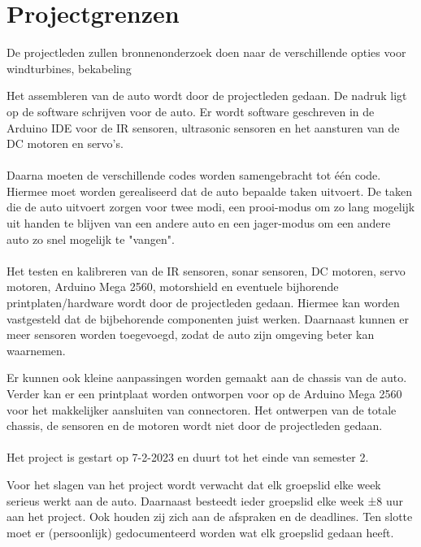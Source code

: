 \section{Projectgrenzen}
De projectleden zullen bronnenonderzoek doen naar de verschillende opties voor windturbines, bekabeling 



Het assembleren van de auto wordt door de projectleden gedaan. De nadruk ligt op de software schrijven voor de auto. Er wordt software geschreven in de Arduino IDE voor de IR sensoren, ultrasonic sensoren en het aansturen van de DC motoren en servo’s.
\\\\
Daarna moeten de verschillende codes worden samengebracht tot één code. Hiermee moet worden gerealiseerd dat de auto bepaalde taken uitvoert. De taken die de auto uitvoert zorgen voor twee modi, een prooi-modus om zo lang mogelijk uit handen te blijven van een andere auto en een jager-modus om een andere auto zo snel mogelijk te "vangen".
\\\\
Het testen en kalibreren van de IR sensoren, sonar sensoren, DC motoren, servo motoren, Arduino Mega 2560, motorshield en eventuele bijhorende printplaten/hardware wordt door de projectleden gedaan. Hiermee kan worden vastgesteld dat de bijbehorende componenten juist werken. Daarnaast kunnen er meer sensoren worden toegevoegd, zodat de auto zijn omgeving beter kan waarnemen. 

Er kunnen ook kleine aanpassingen worden gemaakt aan de chassis van de auto. Verder kan er een printplaat worden ontworpen voor op de Arduino Mega 2560 voor het makkelijker aansluiten van connectoren.
Het ontwerpen van de totale chassis, de sensoren en de motoren wordt niet door de projectleden gedaan.
\\\\
Het project is gestart op 7-2-2023 en duurt tot het einde van semester 2.

Voor het slagen van het project wordt verwacht dat elk groepslid elke week serieus werkt aan de auto. Daarnaast besteedt ieder groepslid elke week ±8 uur aan het project. Ook houden zij zich aan de afspraken en de deadlines. Ten slotte moet er (persoonlijk) gedocumenteerd worden wat elk groepslid gedaan heeft.
